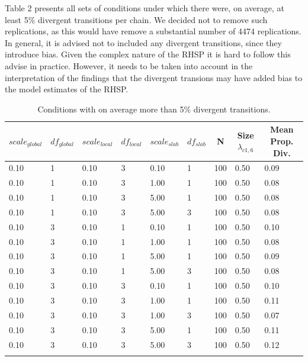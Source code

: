 \documentclass[
  man, donotrepeattitle,floatsintext]{apa6}
\begin{document}
Table 2 presents all sets of conditions under which there were, on average, at least 5\% divergent transitions per chain. We decided not to remove such replications, as this would have remove a substantial number of 4474 replications. In general, it is advised not to included any divergent transitions, since they introduce bias. Given the complex nature of the RHSP it is hard to follow this advise in practice. However, it needs to be taken into account in the interpretation of the findings that the divergent transions may have added bias to the model estimates of the RHSP.

\begin{table}[tbp]

\begin{center}
\begin{threeparttable}

\caption{\label{tab:unnamed-chunk-3}Conditions with on average more than 5\% divergent transitions.}

\begin{tabular}{lllllllll}
\toprule
$scale_{global}$ & \multicolumn{1}{c}{$df_{global}$} & \multicolumn{1}{c}{$scale_{local}$} & \multicolumn{1}{c}{$df_{local}$} & \multicolumn{1}{c}{$scale_{slab}$} & \multicolumn{1}{c}{$df_{slab}$} & \multicolumn{1}{c}{N} & \multicolumn{1}{c}{Size $\lambda_{c1 , 6}$} & \multicolumn{1}{c}{Mean Prop. Div.}\\
\midrule
0.10 & 1 & 0.10 & 3 & 0.10 & 1 & 100 & 0.50 & 0.09\\
0.10 & 1 & 0.10 & 3 & 1.00 & 1 & 100 & 0.50 & 0.08\\
0.10 & 1 & 0.10 & 3 & 5.00 & 1 & 100 & 0.50 & 0.08\\
0.10 & 1 & 0.10 & 3 & 5.00 & 3 & 100 & 0.50 & 0.08\\
0.10 & 3 & 0.10 & 1 & 0.10 & 1 & 100 & 0.50 & 0.10\\
0.10 & 3 & 0.10 & 1 & 1.00 & 1 & 100 & 0.50 & 0.08\\
0.10 & 3 & 0.10 & 1 & 5.00 & 1 & 100 & 0.50 & 0.09\\
0.10 & 3 & 0.10 & 1 & 5.00 & 3 & 100 & 0.50 & 0.08\\
0.10 & 3 & 0.10 & 3 & 0.10 & 1 & 100 & 0.50 & 0.10\\
0.10 & 3 & 0.10 & 3 & 1.00 & 1 & 100 & 0.50 & 0.11\\
0.10 & 3 & 0.10 & 3 & 1.00 & 3 & 100 & 0.50 & 0.07\\
0.10 & 3 & 0.10 & 3 & 5.00 & 1 & 100 & 0.50 & 0.11\\
0.10 & 3 & 0.10 & 3 & 5.00 & 3 & 100 & 0.50 & 0.12\\
\bottomrule
\addlinespace
\end{tabular}


\end{threeparttable}
\end{center}
\end{table}
\end{document}
